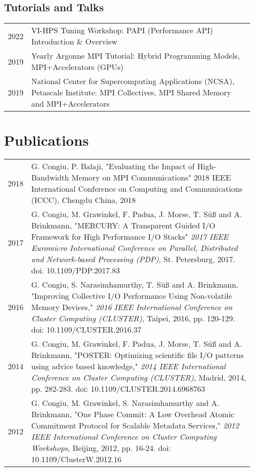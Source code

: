 \documentclass[a4paper,10pt]{article}
\begin{document}
\subsection*{Tutorials and Talks}
\begin{tabular}{rp{11cm}}
    2022 & VI-HPS Tuning Workshop: PAPI (Performance API) Introduction \& Overview \\
    2019 & Yearly Argonne MPI Tutorial: Hybrid Programming Models, MPI+Accelerators (GPUs) \\
    2019 & National Center for Supercomputing Applications (NCSA), Petascale Institute: MPI Collectives, MPI Shared Memory and MPI+Accelerators\\
\end{tabular}

\section{Publications}
\begin{tabular}{rp{11cm}}
        2018 & G. Congiu, P. Balaji, "Evaluating the Impact of High-Bandwidth Memory on MPI %
        Communications" 2018 IEEE International Conference on Computing and Communications (ICCC), %
        Chengdu China, 2018\\
        2017 & G. Congiu, M. Grawinkel, F. Padua, J. Morse, T. Süß and A. Brinkmann, "MERCURY: %
        A Transparent Guided I/O Framework for High Performance I/O Stacks" \textit{2017 IEEE %
        Euromicro International Conference on Parallel, Distributed and Network-based Processing (PDP)}, %
        St. Petersburg, 2017. doi: 10.1109/PDP.2017.83\\
        2016 & G. Congiu, S. Narasimhamurthy, T. Süß and A. Brinkmann, "Improving Collective %
        I/O Performance Using Non-volatile Memory Devices," \textit{2016 IEEE International Conference %
        on Cluster Computing (CLUSTER)}, Taipei, 2016, pp. 120-129. %
        doi: 10.1109/CLUSTER.2016.37\\
        2014 & G. Congiu, M. Grawinkel, F. Padua, J. Morse, T. Süß and A. Brinkmann, "POSTER: %
        Optimizing scientific file I/O patterns using advice based knowledge," \textit{2014 IEEE %
        International Conference on Cluster Computing (CLUSTER)}, Madrid, 2014, pp. 282-283. %
        doi: 10.1109/CLUSTER.2014.6968763\\
        2012 & G. Congiu, M. Grawinkel, S. Narasimhamurthy and A. Brinkmann, "One Phase Commit: %
        A Low Overhead Atomic Commitment Protocol for Scalable Metadata Services," \textit{2012 IEEE %
        International Conference on Cluster Computing Workshops}, Beijing, 2012, pp. 16-24. %
        doi: 10.1109/ClusterW.2012.16\\
\end{tabular}



\end{document}
